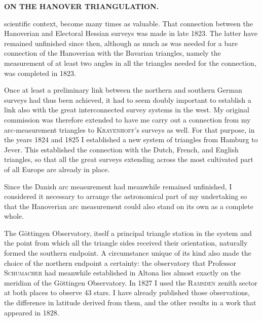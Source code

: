 \noindent\null\hfill{\small\textbf{ON THE HANOVER TRIANGULATION.}}\hfill{}\par\medskip
\noindent scientific context, become many times as valuable. That connection
between the Hanoverian and Electoral Hessian surveys was made in late 1823.
The latter have remained unfinished since then, although as much as was needed
for a bare connection of the Hanoverian with the Bavarian triangles, namely the
measurement of at least two angles in all the triangles needed for the connection,
was completed in 1823.

\par\noindent\hspace*{\parindent}Once at least a preliminary link between the northern and southern German
surveys had thus been achieved, it had to seem doubly important to establish
a link also with the great interconnected survey systems in the west. My
original commission was therefore extended to have me carry out a connection
from my arc-measurement triangles to \textsc{Krayenhoff}'s surveys as well. For
that purpose, in the years 1824 and 1825 I established a new system of triangles
from Hamburg to Jever. This established the connection with the Dutch, French,
and English triangles, so that all the great surveys extending across the most
cultivated part of all Europe are already in place.

\par\noindent\hspace*{\parindent}Since the Danish arc measurement had meanwhile remained unfinished,
I considered it necessary to arrange the astronomical part of my undertaking
so that the Hanoverian arc measurement could also stand on its own as a
complete whole.

\par\noindent\hspace*{\parindent}The Göttingen Observatory, itself a principal triangle station in the system
and the point from which all the triangle sides received their orientation,
naturally formed the southern endpoint. A circumstance unique of its kind
also made the choice of the northern endpoint a certainty: the observatory
that Professor \textsc{Schumacher} had meanwhile established in Altona lies almost
exactly on the meridian of the Göttingen Observatory. In 1827 I used the
\textsc{Ramsden} zenith sector at both places to observe 43 stars. I have already
published those observations, the difference in latitude derived from them, and
the other results in a work that appeared in 1828.

